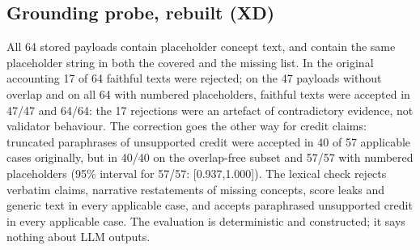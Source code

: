 \subsection{Grounding probe, rebuilt (XD)}
\begin{table}[tbp]
\centering\scriptsize\setlength{\tabcolsep}{3pt}
\caption{XD: constructed feedback texts that disagree with their intended label, over applicable payloads, for the lexical validator, on three subsets of the 64 recorded evaluator payloads.}\label{tab:xd}

\end{table}
All 64 stored payloads contain placeholder concept text, and \xdOverlap{} contain the same placeholder string in both the covered and the missing list. In the original accounting 17 of 64 faithful texts were rejected; on the 47 payloads without overlap and on all 64 with numbered placeholders, faithful texts were accepted in 47/47 and 64/64: the 17 rejections were an artefact of contradictory evidence, not validator behaviour. The correction goes the other way for credit claims: truncated paraphrases of unsupported credit were accepted in 40 of 57 applicable cases originally, but in 40/40 on the overlap-free subset and 57/57 with numbered placeholders (95\% interval for 57/57: [0.937,1.000]). The lexical check rejects verbatim claims, narrative restatements of missing concepts, score leaks and generic text in every applicable case, and accepts paraphrased unsupported credit in every applicable case. The evaluation is deterministic and constructed; it says nothing about LLM outputs.
